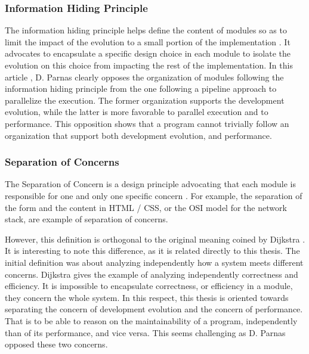 \subsubsection{Information Hiding Principle}

The information hiding principle helps define the content of modules so as to limit the impact of the evolution to a small portion of the implementation \cite{Parnas1972}.
It advocates to encapsulate a specific design choice in each module to isolate the evolution on this choice from impacting the rest of the implementation.
In this article \cite{Parnas1972}, D. Parnas clearly opposes the organization of modules following the information hiding principle from the one following a pipeline approach to parallelize the execution.
The former organization supports the development evolution, while the latter is more favorable to parallel execution and to performance.
This opposition shows that a program cannot trivially follow an organization that support both development evolution, and performance.


\subsubsection{Separation of Concerns}

The Separation of Concern is a design principle advocating that each module is responsible for one and only one specific concern \cite{Tarr1999,Hursch1995}.
For example, the separation of the form and the content in HTML / CSS, or the OSI model for the network stack, are example of separation of concerns.

However, this definition is orthogonal to the original meaning coined by Dijkstra \cite{Dijkstra1982}.
It is interesting to note this difference, as it is related directly to this thesis.
The initial definition was about analyzing independently how a system meets different concerns.
Dijkstra gives the example of analyzing independently correctness and efficiency.
It is impossible to encapsulate correctness, or efficiency in a module, they concern the whole system.
In this respect, this thesis is oriented towards separating the concern of development evolution and the concern of performance.
That is to be able to reason on the maintainability of a program, independently than of its performance, and vice versa.
This seems challenging as D. Parnas opposed these two concerns.

